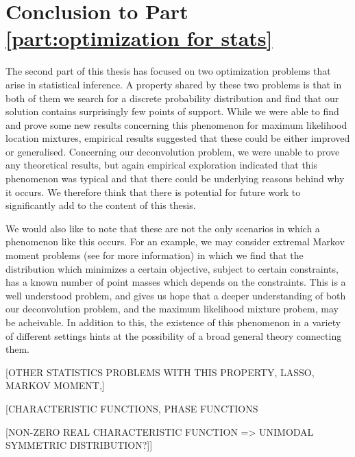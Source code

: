 \chapter{Conclusion to Part \ref{part:optimization for stats}}
\label{Ch:StatisticalOptimizationConclusion}


\graphicspath{{Figures/Mixtures/}}


The second part of this thesis has focused on two optimization problems that arise in statistical inference. A property shared by these two problems is that in both of them we search for a discrete probability distribution and find that our solution contains surprisingly few points of support. While we were able to find and prove some new results concerning this phenomenon for maximum likelihood location mixtures, empirical results suggested that these could be either improved or generalised. Concerning our deconvolution problem, we were unable to prove any theoretical results, but again empirical exploration indicated that this phenomenon was typical and that there could be underlying reasons behind why it occurs. We therefore think that there is potential for future work to significantly add to the content of this thesis. 

We would also like to note that these are not the only scenarios in which a phenomenon like this occurs. For an example, we may consider extremal Markov moment problems (see \cite{Krein1977-ak} for more information) in which we find that the distribution which minimizes a certain objective, subject to certain constraints, has a known number of point masses which depends on the constraints. This is a well understood problem, and gives us hope that a deeper understanding of both our deconvolution problem, and the maximum likelihood mixture probem, may be acheivable. In addition to this, the existence of this phenomenon in a variety of different settings hints at the possibility of a broad general theory connecting them.



[OTHER STATISTICS PROBLEMS WITH THIS PROPERTY, LASSO, MARKOV MOMENT,]

[CHARACTERISTIC FUNCTIONS, PHASE FUNCTIONS

[NON-ZERO REAL CHARACTERISTIC FUNCTION  => UNIMODAL SYMMETRIC DISTRIBUTION?]]